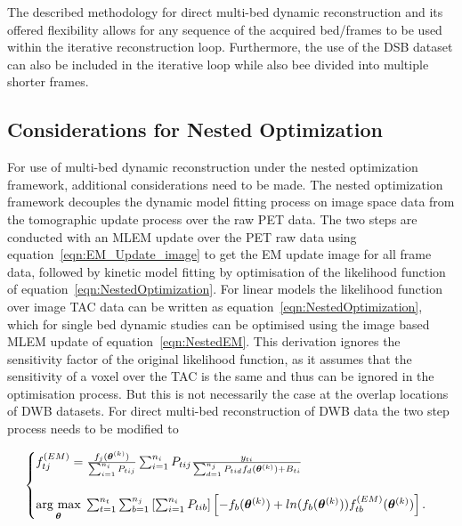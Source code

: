The described methodology for direct multi-bed dynamic reconstruction and its offered flexibility allows for any sequence of the acquired bed/frames to be used within the iterative reconstruction loop. Furthermore, the use of the DSB dataset can also be included in the iterative loop while also bee divided into multiple shorter frames.

\subsection{Considerations for Nested Optimization}
For use of multi-bed dynamic reconstruction under the nested optimization framework, additional considerations need to be made.
The nested optimization framework decouples the dynamic model fitting process on image space data from the tomographic update process over the raw PET data. The two steps are conducted with an MLEM update over the PET raw data using equation~\ref{eqn:EM_Update_image} to get the EM update image for all frame data, followed by kinetic model fitting by optimisation of the likelihood function of equation~\ref{eqn:NestedOptimization}. 
For linear models the likelihood function over image TAC data can be written as equation~\ref{eqn:NestedOptimization}, which for single bed dynamic studies can be optimised using the image based MLEM update of equation~\ref{eqn:NestedEM}.
This derivation ignores the sensitivity factor of the original likelihood function, as it assumes that the sensitivity of a voxel over the TAC is the same and thus can be ignored in the optimisation process. 
But this is not necessarily the case at the overlap locations of DWB datasets. 
For direct multi-bed reconstruction of DWB data the two step process needs to be modified to

\begin{equation}
\label{eq3_3:NestedMultibed}
\text{}
\begin{cases}  
f_{tj}^{(EM)} = \frac{f_j(\bm\theta^{(k)})}{\sum_{i=1}^{n_i} P_{tij}} 
\sum_{i=1}^{n_i} P_{tij} 
\frac{y_{ti}}{\sum_{d=1}^{n_j} P_{tid} f_d(\bm\theta^{(k)}) + B_{ti} } \\ \\
\underset{\bm{\theta}}{\operatorname{arg}\,\operatorname{max}}\; 
\sum_{t=1}^{n_t} \sum_{b=1}^{n_j} \left[ \sum_{i=1}^{n_i}  P_{tib} \right]
\left[ -f_b(\bm\theta^{(k)}) + 
ln( f_b(\bm\theta^{(k)})) 
f_{tb}^{(EM)}(\bm{\theta}^{(k)})
\right] .\\
\end{cases}
\end{equation}


